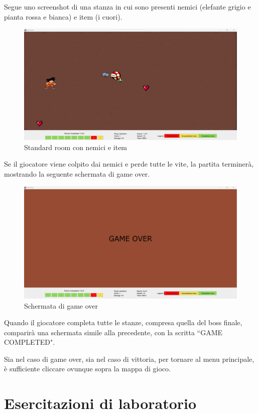 \documentclass[a4paper,12pt]{report}
\begin{document}
\newpage
Segue uno screenshot di una stanza in cui sono presenti nemici 
(elefante grigio e pianta rossa e bianca) e item (i cuori).
\begin{figure}[h]
\centering{}
\includegraphics[width=\textwidth]{img/standardRoom.png}
\caption{Standard room con nemici e item}
\label{img/standardRoom}
\end{figure}

Se il giocatore viene colpito dai nemici e perde tutte le vite, la partita terminerà, mostrando la seguente schermata di game over.
\begin{figure}[H]
\centering{}
\includegraphics[width=\textwidth]{img/gameOver.png}
\caption{Schermata di game over}
\label{img/gameover}
\end{figure}

Quando il giocatore completa tutte le stanze, compresa quella del boss finale, comparirà una
schermata simile alla precedente, con la scritta ``GAME COMPLETED".

Sia nel caso di game over, sia nel caso di vittoria, per tornare al menu principale, è sufficiente cliccare 
ovunque sopra la mappa di gioco.


\chapter{Esercitazioni di laboratorio}
\end{document}
